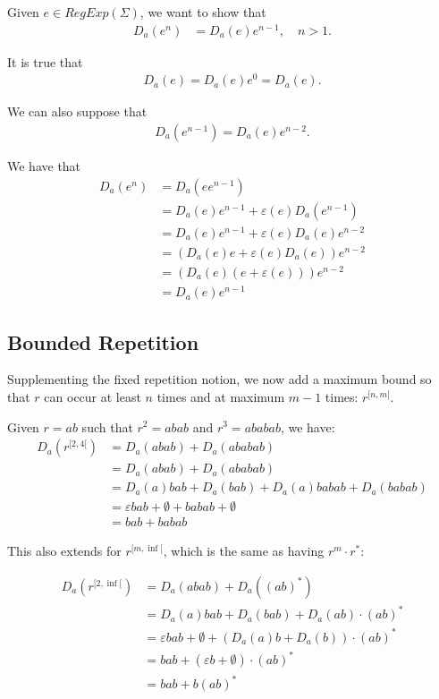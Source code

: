 \noindent Given $e \in RegExp(\Sigma)$, we want to show that
\begin{align*}
	D_a(e^n) &= D_a(e)e^{n-1}, \quad n>1.
\end{align*}

\noindent It is true that
\begin{align*}
	D_a(e) = D_a(e)e^0 = D_a(e). 
\end{align*}

\noindent We can also suppose that
\begin{align*}
	D_a(e^{n-1}) = D_a(e)e^{n-2}.
\end{align*}

\noindent We have that
\begin{align*}
	D_a(e^n) &= D_a(ee^{n-1}) \\
	&= D_a(e)e^{n-1} + \varepsilon(e)D_a(e^{n-1}) \\
	&= D_a(e)e^{n-1} + \varepsilon(e)D_a(e)e^{n-2} \\
	&= (D_a(e)e + \varepsilon(e)D_a(e))e^{n-2} \\
	&= (D_a(e)(e+\varepsilon(e)))e^{n-2} \\
	&= D_a(e)e^{n-1}
\end{align*}


\subsection{Bounded Repetition}
Supplementing the fixed repetition notion, we now add a maximum bound so that $r$ can occur at least $n$ times and at maximum $m-1$ times: $r^{[n,m[}$.

Given $r = ab$ such that $r^2 = abab$ and $r^3 = ababab$, we have:
\begin{align*}
	D_a(r^{[2,4[}) &= D_a(abab) + D_a(ababab) \\
	&= D_a(abab) + D_a(ababab) \\
	&= D_a(a)bab + D_a(bab) + D_a(a)babab + D_a(babab) \\
	&= \varepsilon bab + \emptyset + babab + \emptyset \\
	&= bab + babab
\end{align*}

This also extends for $r^{[m, \inf[}$, which is the same as having $r^m \cdot r^*$:

\begin{align*}
	D_a(r^{[2,\inf[}) &= D_a(abab) + D_a((ab)^*) \\
	&= D_a(a)bab + D_a(bab) + D_a(ab)\cdot(ab)^* \\
	&= \varepsilon bab + \emptyset + (D_a(a)b + D_a(b)) \cdot (ab)^* \\
	&= bab + (\varepsilon b + \emptyset) \cdot (ab)^* \\
	&= bab + b(ab)^*
\end{align*}

